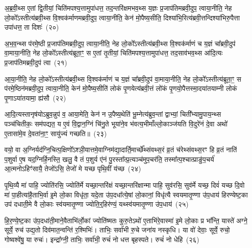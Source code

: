 अ॒ब्र॒वी॒थ्स ए॒तां द्वि॒तीयां॒ चिति॑मपश्य॒त्तामुपा॑धत्त॒ तद॒न्तरि॑क्षमभव॒थ्स य॒ज्ञः प्र॒जा\-प॑तिमब्रवी॒दुप॒ त्वाया॒नीति॒ नेह लो॒को᳚\-ऽस्तीत्य॑ब्रवी॒थ्स वि॒श्वक॑र्माणमब्रवी॒दुप॒ त्वाया॒नीति॒ केन॑ मो॒पैष्य॒सीति॒ दिश्या॑भि॒रित्य॑ब्रवी॒त्तन्दिश्या॑भिरु॒पैत्ता उपा॑धत्त॒ ता दिशः॑~(२०)\ip

अ॒भ॒व॒न्थ्स प॑रमे॒ष्ठी प्र॒जा\-प॑तिमब्रवी॒दुप॒ त्वाया॒नीति॒ नेह लो॒को᳚\-ऽस्तीत्य॑ब्रवी॒थ्स वि॒श्वक॑र्माणं च य॒ज्ञं चा᳚ब्रवी॒दुप॑ वा॒माया॒नीति॒ नेह लो॒को᳚\-ऽस्तीत्य॑ब्रूता॒ꣳ॒ स ए॒तां तृ॒तीयां॒ चिति॑मपश्य॒त्तामुपा॑धत्त॒ तद॒साव॑भव॒थ्स आ॑दि॒त्यः प्र॒जा\-प॑तिमब्रवी॒दुप॑ त्वा~(२१)\ip

आ॒या॒नीति॒ नेह लो॒को᳚\-ऽस्तीत्य॑ब्रवी॒थ्स वि॒श्वक॑र्माणं च य॒ज्ञं चा᳚ब्रवी॒दुप॑ वा॒माया॒नीति॒ नेह लो॒को᳚\-ऽस्तीत्य॑ब्रूता॒ꣳ॒ स प॑रमे॒ष्ठिन॑मब्रवी॒दुप॒ त्वाया॒नीति॒ केन॑ मो॒पैष्य॒सीति॑ लोकं पृ॒णयेत्य॑ब्रवी॒त्तं लो॑कं पृ॒णयो॒पैत्तस्मा॒दया॑तयाम्नी लोकं पृ॒णा\-ऽया॑तयामा॒ ह्य॑सौ~(२२)\ip

आ॒दि॒त्यस्तानृष॑यो\-ऽब्रुव॒न्नुप॑ व॒ आया॒मेति॒ केन॑ न उ॒पैष्य॒थेति॑ भू॒म्नेत्य॑ब्रुव॒न्तां द्वाभ्यां॒ चिती᳚भ्यामु॒पाय॒न्थ्स पञ्च॑चितीकः॒ सम॑पद्यत॒ य ए॒वं वि॒द्वान॒ग्निं चि॑नु॒ते भूया॑ने॒व भ॑वत्य॒भीमाँल्लो॒काञ्ज॑यति वि॒दुरे॑नं दे॒वा अथो॑ ए॒तासा॑मे॒व दे॒वता॑ना॒ꣳ॒ सायु॑ज्यं गच्छति॥~(२३)\ip

{\anuvakamend[{तम॑सा\-ऽऽ\-दि॒त्यो᳚\-ऽस्तीति॒ दिश॑ आदि॒त्यः प्र॒जा\-प॑तिमब्रवी॒दुप॑ त्वा॒\-ऽसौ पञ्च॑चत्वारिꣳशच्च}]}

वयो॒ वा अ॒ग्निर्यद॑ग्नि॒चित्प॒क्षिणो᳚\-ऽश्ञी॒यात्तमे॒वाग्निम॑द्या॒दार्ति॒मार्च्छे᳚थ्संवथ्स॒रं व्र॒तं च॑रेथ्संवथ्स॒रꣳ हि व्र॒तं नाति॑ प॒शुर्वा ए॒ष यद॒ग्निर्\mbox{}हि॒नस्ति॒ खलु॒ वै तं प॒शुर्य ए॑नं पु॒रस्ता᳚त्प्र॒त्यञ्च॑मुप॒चर॑ति॒ तस्मा᳚त्प॒श्चात्प्राङु॑प॒चर्य॑ आ॒त्मनो\-ऽहिꣳ॑सायै॒ तेजो॑\-ऽसि॒ तेजो॑ मे यच्छ पृथि॒वीं य॑च्छ~(२४)\ip

पृ॒थि॒व्यै मा॑ पाहि॒ ज्योति॑रसि॒ ज्योति॑र्मे यच्छा॒न्तरि॑क्षं यच्छा॒न्तरि॑क्षान्मा पाहि॒ सुव॑रसि॒ सुव॑र्मे यच्छ॒ दिवं॑ यच्छ दि॒वो मा॑ पा॒हीत्या॑है॒ताभि॒र्वा इ॒मे लो॒का विधृ॑ता॒ यदे॒ता उ॑प॒दधा᳚त्ये॒षां लो॒कानां॒ विधृ॑त्यै स्वयमातृ॒ण्णा उ॑प॒धाय॑ हिरण्येष्ट॒का उप॑ दधाती॒मे वै लो॒काः स्व॑यमातृ॒ण्णा ज्योति॒र्॒\mbox{}हिर॑ण्यं॒ यथ्स्व॑यमातृ॒ण्णा उ॑प॒धाय॑~(२५)\ip

हि॒र॒ण्ये॒ष्ट॒का उ॑प॒दधा॑ती॒माने॒वैताभि॑र्लो॒कां ज्योति॑ष्मतः कुरु॒ते\-ऽथो॑ ए॒ताभि॑रे॒वास्मा॑ इ॒मे लो॒काः प्र भा᳚न्ति॒ यास्ते॑ अग्ने॒ सूर्ये॒ रुच॑ उद्य॒तो दिव॑मात॒न्वन्ति॑ र॒श्मिभिः॑। ताभिः॒ सर्वा॑भी रु॒चे जना॑य नस्कृधि। या वो॑ देवाः॒ सूर्ये॒ रुचो॒ गोष्वश्वे॑षु॒ या रुचः॑। इन्द्रा᳚ग्नी॒ ताभिः॒ सर्वा॑भी॒ रुचं॑ नो धत्त बृहस्पते। रुचं॑ नो धेहि~(२६)\ip

